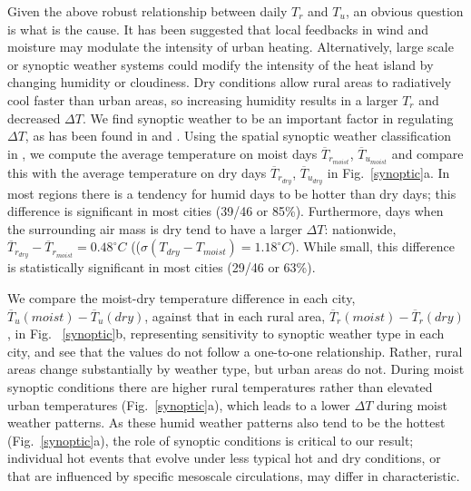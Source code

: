 \documentclass[12pt]{iopart}
\begin{document}
{Given the above robust relationship between daily $T_r$ and $T_u$, an obvious question is what is the cause.  It has been suggested that local feedbacks in wind \cite{haeger1999advection} and moisture \cite{li2013synergistic} may modulate the intensity of urban heating. 
Alternatively, large scale or synoptic weather systems could modify the intensity of the heat island by changing humidity or cloudiness. Dry conditions allow rural areas to radiatively cool faster than urban areas, so increasing humidity results in a larger $T_r$ and decreased $\Delta T$. 
We find synoptic weather to be an important factor in regulating $\Delta T$, as has been found in  and . Using the spatial synoptic weather classification in ,
 we compute the average temperature on moist days $\overline{T}_{r_{moist}}$, $\overline{T}_{u_{moist}}$ and compare this with the average temperature on dry days $\overline{T}_{r_{dry}}$, $\overline{T}_{u_{dry}}$ in Fig.~\ref{synoptic}a.
In most regions there is a tendency for humid days to be hotter than dry days; this difference is significant in most cities (39/46 or 85\%).  
Furthermore, days when the surrounding air mass is dry tend to have a larger $\Delta T$: nationwide, $\overline{ T}_{r_{dry}}- \overline{T}_{r _{moist}} = 0.48^\circ  C$ (($\sigma \left( T_{dry} -  T_{moist}\right) = 1.18 ^\circ  C $). While small, this difference is statistically significant in most cities (29/46 or 63\%). 

We compare the moist-dry temperature difference in each city, $  \overline{T}_{u}( {moist} )  -  \overline{T}_{u}( {dry} ) $, 
against that in each rural area, $\overline{T}_{r}( {moist} ) -  \overline{T}_{r}( {dry} ) $, in Fig. ~\ref{synoptic}b, representing sensitivity to synoptic weather type in each city,
and see that the values do not follow a one-to-one relationship. Rather, rural areas change substantially by weather type, but urban areas do not. During moist synoptic conditions there are higher rural temperatures rather than elevated urban temperatures (Fig.~\ref{synoptic}a), which leads to a lower $\Delta T$ during moist weather patterns. 
As these humid weather patterns also tend to be the hottest (Fig.~\ref{synoptic}a), the role of synoptic conditions is critical to our result; individual hot events that evolve under less typical hot and dry conditions, or that are influenced by specific mesoscale circulations, may differ in characteristic. 

}
\end{document}
